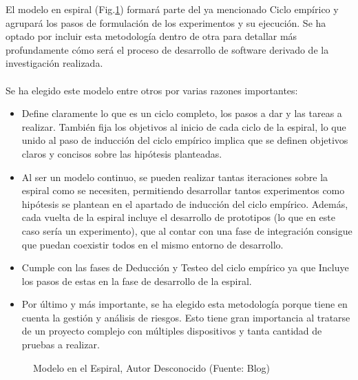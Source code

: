 El modelo en espiral (Fig.\ref{fig:MetodologiaEspiral}) formará parte del ya mencionado Ciclo empírico y agrupará los pasos de formulación de los experimentos y su ejecución. Se ha optado por incluir esta metodología dentro de otra para detallar más profundamente cómo será el proceso de desarrollo de software derivado de la investigación realizada.
\\ \\
Se ha elegido este modelo entre otros por varias razones importantes:
\begin{itemize}
    \item Define claramente lo que es un ciclo completo, los pasos a dar y las tareas a realizar. También fija los objetivos al inicio de cada ciclo de la espiral, lo que unido al paso de inducción del ciclo empírico implica que se definen objetivos claros y concisos sobre las hipótesis planteadas.
    \item Al ser un modelo continuo, se pueden realizar tantas iteraciones sobre la espiral como se necesiten, permitiendo desarrollar tantos experimentos como hipótesis se plantean en el apartado de inducción del ciclo empírico. Además, cada vuelta de la espiral incluye el desarrollo de prototipos (lo que en este caso sería un experimento), que al contar con una fase de integración consigue que puedan coexistir todos en el mismo entorno de desarrollo.
    \item Cumple con las fases de Deducción y Testeo del ciclo empírico ya que Incluye los pasos de estas en la fase de desarrollo de la espiral.
    \item Por último y más importante, se ha elegido esta metodología porque tiene en cuenta la gestión y análisis de riesgos. Esto tiene gran importancia al tratarse de un proyecto complejo con múltiples dispositivos y tanta cantidad de pruebas a realizar.
\end{itemize}

\begin{figure}[thbp]
    \centering
    \caption{Modelo en el Espiral, Autor Desconocido (Fuente: Blog\autocite{CicloVidaSoftware2016})} 
    \label{fig:MetodologiaEspiral}
\end{figure}


